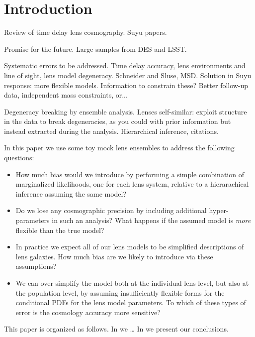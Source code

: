 \documentclass[useAMS,usenatbib]{mn2e}
\begin{document}
\section{Introduction}

Review of time delay lens cosmography. Suyu papers.

Promise for the future. Large samples from DES and LSST.

Systematic errors to be addressed. Time delay accuracy, lens environments and line of sight, lens model degeneracy. Schneider and Sluse, MSD. Solution in Suyu response: more flexible models. Information to constrain these? Better follow-up data, independent mass constraints, or...

Degeneracy breaking by ensemble analysis. Lenses self-similar: exploit structure in the data to break degeneracies, as you could with prior information but instead extracted during the analysis. Hierarchical inference, citations.

In this paper we use some toy mock lens ensembles to address the following questions:

\begin{itemize}

\item How much bias would we introduce by performing a simple combination of marginalized likelihoods, one for each lens system, relative to a hierarachical inference assuming the same model?

\item Do we lose any cosmographic precision by including additional hyper-parameters in such an analysis? What happens if the assumed model is {\it more} flexible than the true model?

\item In practice we expect all of our lens models to be simplified descriptions of lens galaxies. How much bias are we likely to introduce via these assumptions?

\item We can over-simplify the model both at the individual lens level, but also at the population level, by assuming insufficiently flexible forms for the conditional PDFs for the lens model parameters. To which of these types of error is the cosmology accuracy more sensitive?

\end{itemize}

This paper is organized as follows. In  we \ldots
In  we present our conclusions.
\end{document}
